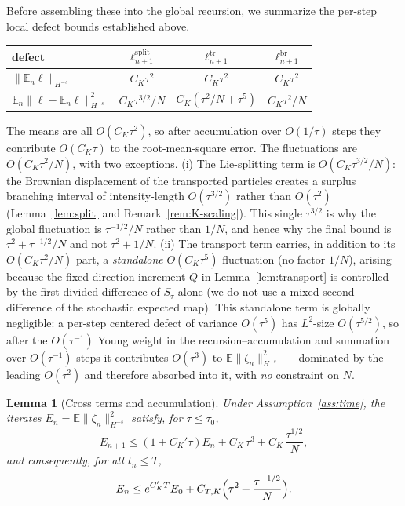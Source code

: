\documentclass[a4paper,fleqn]{cas-sc}
\newtheorem{lemma}[theorem]{Lemma}
\theoremstyle{definition}
\theoremstyle{remark}
\begin{document}
Before assembling these into the global recursion, we summarize the per-step local
defect bounds established above.
\begin{center}
\renewcommand{\arraystretch}{1.4}
\begin{tabular}{lccc}
\hline
defect & $\ell^{\mathrm{split}}_{n+1}$ & $\ell^{\mathrm{tr}}_{n+1}$ & $\ell^{\mathrm{br}}_{n+1}$\\
\hline
$\|\mathbb E_n\ell\|_{H^{-s}}$ & $C_K\tau^2$ & $C_K\tau^2$ & $C_K\tau^2$\\
$\mathbb E_n\|\ell-\mathbb E_n\ell\|_{H^{-s}}^2$ & $C_K\tau^{3/2}/N$ & $C_K(\tau^2/N+\tau^5)$ & $C_K\tau^2/N$\\
\hline
\end{tabular}
\end{center}
The means are all $O(C_K\tau^2)$, so after accumulation over $O(1/\tau)$ steps they
contribute $O(C_K\tau)$ to the root-mean-square error. The fluctuations are
$O(C_K\tau^2/N)$, with two exceptions. (i) The Lie-splitting term is
$O(C_K\tau^{3/2}/N)$: the Brownian displacement of the transported particles creates a
surplus branching interval of intensity-length $O(\tau^{3/2})$ rather than $O(\tau^2)$
(Lemma~\ref{lem:split} and Remark~\ref{rem:K-scaling}). This single $\tau^{3/2}$ is
why the global fluctuation is $\tau^{-1/2}/N$ rather than $1/N$, and hence why the
final bound is $\tau^2+\tau^{-1/2}/N$ and not $\tau^2+1/N$. (ii) The transport term
carries, in addition to its $O(C_K\tau^2/N)$ part, a \emph{standalone} $O(C_K\tau^5)$
fluctuation (no factor $1/N$), arising because the fixed-direction increment $Q$ in
Lemma~\ref{lem:transport} is controlled by the first divided difference of $S_\tau$
alone (we do not use a mixed second difference of the stochastic expected map). This
standalone term is globally negligible: a per-step centered defect of variance
$O(\tau^5)$ has $L^2$-size $O(\tau^{5/2})$, so after the $O(\tau^{-1})$ Young weight in
the recursion--accumulation and summation over $O(\tau^{-1})$ steps it contributes
$O(\tau^3)$ to $\mathbb E\|\zeta_n\|_{H^{-s}}^2$ --- dominated by the leading
$O(\tau^2)$ and therefore absorbed into it, with \emph{no} constraint on $N$.

\begin{lemma}[Cross terms and accumulation]\label{lem:accum}
Under Assumption~\ref{ass:time}, the iterates $E_n=\mathbb E\|\zeta_n\|_{H^{-s}}^2$
satisfy, for $\tau\le\tau_0$,
\[
E_{n+1}\le(1+C_K'\tau)E_n+C_K\,\tau^3+C_K\,\frac{\tau^{1/2}}{N},
\]
and consequently, for all $t_n\le T$,
\[
E_n\le e^{C_K'T}E_0+C_{T,K}\Bigl(\tau^2+\frac{\tau^{-1/2}}{N}\Bigr).
\]
\end{lemma}
\end{document}
